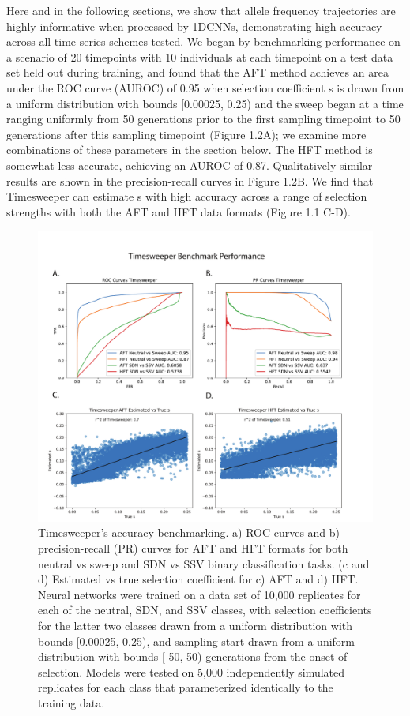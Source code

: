 Here and in the following sections, we show that allele frequency trajectories are highly informative when processed by 1DCNNs, demonstrating high accuracy across all time-series schemes tested. We began by benchmarking performance on a scenario of 20 timepoints with 10 individuals at each timepoint on a test data set held out during training, and found that the AFT method achieves an area under the ROC curve (AUROC) of 0.95 when selection coefficient s is drawn from a uniform distribution with bounds [0.00025, 0.25) and the sweep began at a time ranging uniformly from 50 generations prior to the first sampling timepoint to 50 generations after this sampling timepoint (Figure 1.2A); we examine more combinations of these parameters in the section below. The HFT method is somewhat less accurate, achieving an AUROC of 0.87. Qualitatively similar results are shown in the precision-recall curves in Figure 1.2B. We find that Timesweeper can estimate s with high accuracy across a range of selection strengths with both the AFT and HFT data formats (Figure 1.1 C-D). 

\begin{figure}
    \centering
    \includegraphics[width=\textwidth]{figures/ch1/Figure_2.pdf}
    \caption[Timesweeper's accuracy benchmarking]{Timesweeper's accuracy benchmarking. a) ROC curves and b) precision-recall (PR) curves for AFT and HFT formats for both neutral vs sweep and SDN vs SSV binary classification tasks. (c and d) Estimated vs true selection coefficient for c) AFT and d) HFT. Neural networks were trained on a data set of 10,000 replicates for each of the neutral, SDN, and SSV classes, with selection coefficients for the latter two classes drawn from a uniform distribution with bounds [0.00025, 0.25), and sampling start drawn from a uniform distribution with bounds [-50, 50) generations from the onset of selection. Models were tested on 5,000 independently simulated replicates for each class that parameterized identically to the training data.}
    \label{fig:enter-label}
\end{figure}

